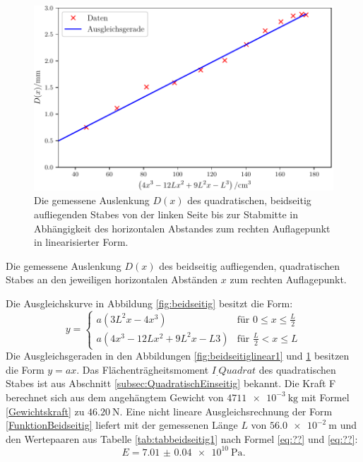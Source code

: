\begin{figure}
	\centering
	\includegraphics[width=\linewidth-70pt,height=\textheight-70pt,keepaspectratio]{content/images/StabQuadratBeidseitig3.pdf}
	\caption{Die gemessene Auslenkung $D(x)$ des quadratischen, beidseitig aufliegenden Stabes von der linken Seite bis zur Stabmitte in Abhängigkeit des horizontalen Abstandes zum rechten Auflagepunkt in linearisierter Form.}
	\label{fig:beidseitiglinear2}
\end{figure}
\begin{table}
	\caption{Die gemessene Auslenkung $D(x)$ des beidseitig aufliegenden, quadratischen Stabes an den jeweiligen horizontalen Abständen $x$ zum rechten Auflagepunkt.}
	\begin{minipage}[c]{0.5\textwidth}
		\centering
		
	\end{minipage}
	\begin{minipage}[c]{0.5\textwidth}
		\centering
		
	\end{minipage}
\end{table}
Die Ausgleichskurve in Abbildung \ref{fig:beidseitig} besitzt die Form:
\begin{equation}
	y =
	\begin{cases}
	a\left(3L^2 x-4x^3\right)& \text{für }0\leq x \leq \frac{L}{2} \\
	a\left(4 x^3 -12 L x^2 + 9 L^2 x -L 3 \right)& \text{für }\frac{L}{2} < x \leq L
	\end{cases} \label{FunktionBeidseitig}
\end{equation}
Die Ausgleichsgeraden in den Abbildungen \ref{fig:beidseitiglinear1} und \ref{fig:beidseitiglinear2} besitzen die Form $y=a x$.
Das Flächenträgheitsmoment $I_.{Quadrat}$ des quadratischen Stabes ist aus Abschnitt \ref{subsec:QuadratischEinseitig} bekannt.  Die Kraft F berechnet sich aus dem angehängtem Gewicht von $\SI{4711e-3}{\kilogram}$ mit Formel \eqref{Gewichtskraft} zu $\SI{46.20}{\newton}$. Eine nicht lineare Ausgleichsrechnung der Form \eqref{FunktionBeidseitig} liefert mit der gemessenen Länge $L$ von $\SI{56.0e-2}{\metre}$ und den Wertepaaren aus Tabelle \ref{tab:tabbeidseitig1} nach Formel \eqref{eq:??} und \eqref{eq:??}:
\begin{displaymath}
E = \SI{7.01(4)e10}{\pascal}\text{.}
\end{displaymath}
